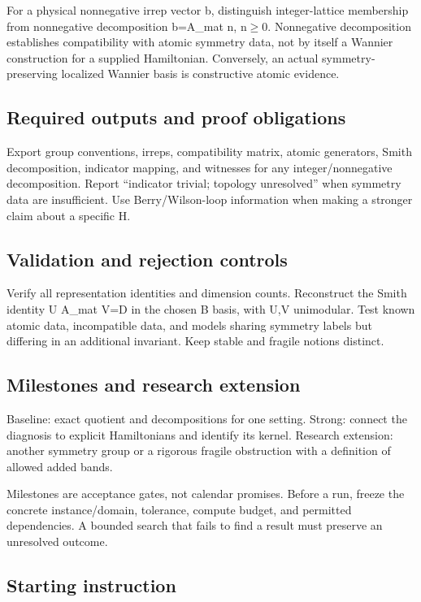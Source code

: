 \documentclass[
  11pt,
]{article}
\begin{document}
For a physical nonnegative irrep vector b, distinguish integer-lattice
membership from nonnegative decomposition b=A\_mat n,
n\ensuremath{\ge}0. Nonnegative decomposition establishes compatibility
with atomic symmetry data, not by itself a Wannier construction for a
supplied Hamiltonian. Conversely, an actual symmetry-preserving
localized Wannier basis is constructive atomic evidence.

\subsection{Required outputs and proof obligations}

Export group conventions, irreps, compatibility matrix, atomic
generators, Smith decomposition, indicator mapping, and witnesses for
any integer/nonnegative decomposition. Report ``indicator trivial;
topology unresolved'' when symmetry data are insufficient. Use
Berry/Wilson-loop information when making a stronger claim about a
specific H.

\subsection{Validation and rejection controls}

Verify all representation identities and dimension counts. Reconstruct
the Smith identity U A\_mat V=D in the chosen B basis, with U,V
unimodular. Test known atomic data, incompatible data, and models
sharing symmetry labels but differing in an additional invariant. Keep
stable and fragile notions distinct.

\subsection{Milestones and research extension}

Baseline: exact quotient and decompositions for one setting. Strong:
connect the diagnosis to explicit Hamiltonians and identify its kernel.
Research extension: another symmetry group or a rigorous fragile
obstruction with a definition of allowed added bands.

Milestones are acceptance gates, not calendar promises. Before a run,
freeze the concrete instance/domain, tolerance, compute budget, and
permitted dependencies. A bounded search that fails to find a result
must preserve an unresolved outcome.

\subsection{Starting instruction}
\end{document}
